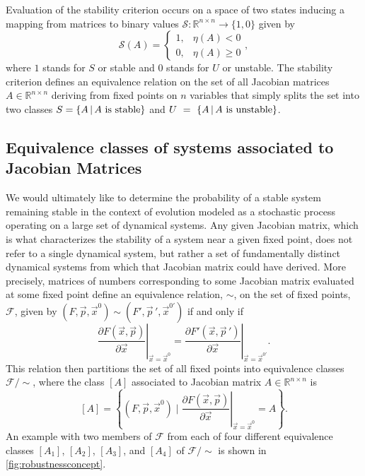 Evaluation of the stability criterion occurs on a space of two states inducing a mapping from matrices to binary values $\mathcal{S} \colon \mathbb{R}^{n \times n} \rightarrow \{ 1, 0 \}$ given by
 \begin{equation}\label{eq:stabeval}
   \mathcal{S}(A) = \left\{
     \begin{array}{lr}
       1, & \eta (A) < 0\\
       0, & \eta (A) \geq 0
     \end{array},
   \right.
\end{equation}
where $1$ stands for $S$ or stable and $0$ stands for $U$ or unstable. The stability criterion defines an equivalence relation on the set of all Jacobian matrices $A \in \mathbb{R}^{n \times n}$ deriving from fixed points on $n$ variables that simply splits the set into two classes $S=\{ A \, | \, A \hbox{ is stable}  \}$ and $U~=~\{ A \, | \, A \hbox{ is unstable} \}$.

\subsection{Equivalence classes of systems associated to Jacobian Matrices}
We would ultimately like to determine the probability of a stable system remaining stable in the context of evolution modeled as a stochastic process operating on a large set of dynamical systems. Any given Jacobian matrix, which is what characterizes the stability of a system near a given fixed point, does not refer to a single dynamical system, but rather a set of fundamentally distinct dynamical systems from which that Jacobian matrix could have derived. More precisely, matrices of numbers corresponding to some Jacobian matrix evaluated at some fixed point define an equivalence relation, $\sim$, on the set of fixed points, $\mathcal{F}$, given by $(F,\vec{p},\vec{x}^0) \sim (F',\vec{p}\,',\vec{x}^{0'}) $ if and only if
\begin{equation}\label{eq:jaceqrel}
\left. \frac{\partial F(\vec{x},\vec{p})}{\partial \vec{x}} \right|_{\vec{x} = \vec{x}^0} =
\left. \frac{\partial F'(\vec{x},\vec{p}\,')}{\partial \vec{x}} \right|_{\vec{x} = \vec{x}^{0'}}.
\end{equation}
This relation then partitions the set of all fixed points into equivalence classes $\mathcal{F}/{\sim}$, where the class $[A]$ associated to Jacobian matrix $A \in \mathbb{R}^{n \times n}$ is
\begin{equation}\label{eq:jaceqs}
[A] = \left\{ (F,\vec{p},\vec{x}^0) \; \Bigg| \; \left. \frac{\partial F(\vec{x},\vec{p})}{\partial \vec{x}} \right|_{\vec{x} = \vec{x}^0} = A \right\}.
\end{equation}
An example with two members of $\mathcal{F}$ from each of four different equivalence classes $[A_1]$, $[A_2]$, $[A_3]$, and $[A_4]$ of $\mathcal{F}/{\sim}$ is shown in \ref{fig:robustnessconcept}.

